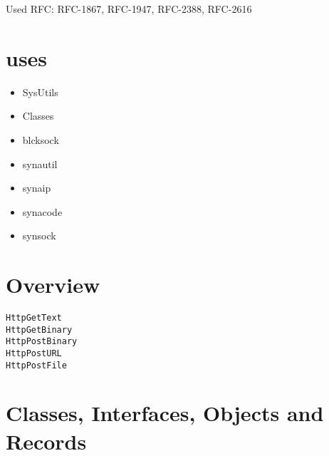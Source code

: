 \documentclass{report}
\newif\ifpdf
\begin{document}
Used RFC: RFC{-}1867, RFC{-}1947, RFC{-}2388, RFC{-}2616
\section{uses}
\begin{itemize}
\item \begin{ttfamily}SysUtils\end{ttfamily}\item \begin{ttfamily}Classes\end{ttfamily}\item \begin{ttfamily}blcksock\end{ttfamily}\item \begin{ttfamily}synautil\end{ttfamily}\item \begin{ttfamily}synaip\end{ttfamily}\item \begin{ttfamily}synacode\end{ttfamily}\item \begin{ttfamily}synsock\end{ttfamily}\end{itemize}
\section{Overview}
\begin{description}
\item[\texttt{\begin{ttfamily}THTTPSend\end{ttfamily} Class}]
\end{description}
\begin{description}
\item[\texttt{HttpGetText}]
\item[\texttt{HttpGetBinary}]
\item[\texttt{HttpPostBinary}]
\item[\texttt{HttpPostURL}]
\item[\texttt{HttpPostFile}]
\end{description}
\section{Classes, Interfaces, Objects and Records}
\ifpdf
\end{document}
